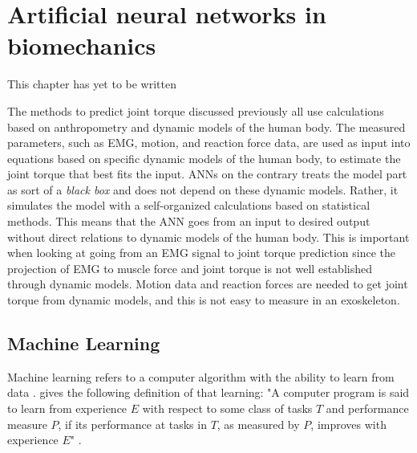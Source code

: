 \section{Artificial neural networks in biomechanics}
This chapter has yet to be written
\\
\cite{Ardestani2014,Liu2009,Lee14-1,Smith2009,Naeem2012,Kiguchi2012}

The methods to predict joint torque discussed previously all use calculations based on anthropometry and dynamic models of the human body. 
The measured parameters, such as \ac{EMG}, motion, and reaction force data, are used as input into equations based on specific dynamic models of the human body, to estimate the joint torque that best fits the input.
\acp{ANN} on the contrary treats the model part as sort of a \textit{black box} and does not depend on these dynamic models. 
Rather, it simulates the model with a self-organized calculations based on statistical methods.
This means that the \ac{ANN} goes from an input to desired output without direct relations to dynamic models of the human body.
This is important when looking at going from an \ac{EMG} signal to joint torque prediction since the projection of \ac{EMG} to muscle force and joint torque is not well established through dynamic models.
Motion data and reaction forces are needed to get joint torque from dynamic models, and this is not easy to measure in an exoskeleton.


\subsection{Machine Learning}
Machine learning refers to a computer algorithm with the ability to learn from data \cite{Goodfellow2016}. \citeauthor{Mitchell1997} gives the following definition of that learning: "A computer program is said to learn from experience $E$ with respect to some class of tasks $T$ and performance measure $P$, if its performance at tasks in $T$, as measured by $P$, improves with experience $E$" \parencite[2]{Mitchell1997}.

